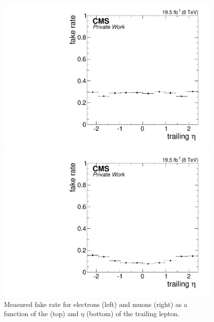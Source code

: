 \begin{figure}[htbp]
\begin{minipage}[t]{0.49\textwidth}
\includegraphics[width=\textwidth]{plots/BG/nonPrompt/fakeRate_ele_Inclusive_Full2012_TrailingEta_None.pdf}
\end{minipage}
\begin{minipage}[t]{0.49\textwidth}
\includegraphics[width=\textwidth]{plots/BG/nonPrompt/fakeRate_mu_Inclusive_Full2012_TrailingEta_None.pdf}
\end{minipage}
\caption{Measured fake rate for electrons (left) and muons (right) as a function of the \pt (top) and $\eta$ (bottom) of the trailing lepton.}
\label{fig:fakeRate}
\end{figure} 
